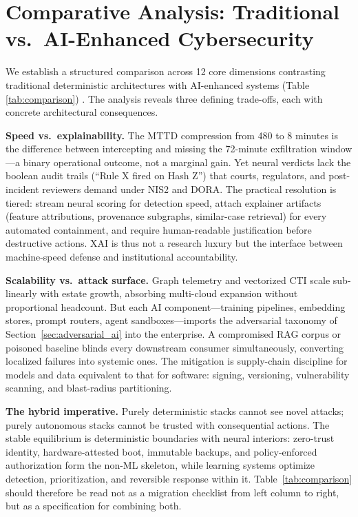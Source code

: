 \documentclass[conference,10pt,twocolumn,a4paper]{IEEEtran}
\begin{document}
\section{Comparative Analysis: Traditional vs.\ AI-Enhanced Cybersecurity}
We establish a structured comparison across 12 core dimensions contrasting traditional deterministic architectures with AI-enhanced systems (Table \ref{tab:comparison}) \cite{nist_csf_ai_2026, enisa_etl_2025, nist_ir_8596_2025}. The analysis reveals three defining trade-offs, each with concrete architectural consequences.

\textbf{Speed vs.\ explainability.} The MTTD compression from 480 to 8 minutes is the difference between intercepting and missing the 72-minute exfiltration window---a binary operational outcome, not a marginal gain. Yet neural verdicts lack the boolean audit trails (``Rule X fired on Hash Z'') that courts, regulators, and post-incident reviewers demand under NIS2 and DORA. The practical resolution is tiered: stream neural scoring for detection speed, attach explainer artifacts (feature attributions, provenance subgraphs, similar-case retrieval) for every automated containment, and require human-readable justification before destructive actions. XAI is thus not a research luxury but the interface between machine-speed defense and institutional accountability.

\textbf{Scalability vs.\ attack surface.} Graph telemetry and vectorized CTI scale sub-linearly with estate growth, absorbing multi-cloud expansion without proportional headcount. But each AI component---training pipelines, embedding stores, prompt routers, agent sandboxes---imports the adversarial taxonomy of Section~\ref{sec:adversarial_ai} into the enterprise. A compromised RAG corpus or poisoned baseline blinds every downstream consumer simultaneously, converting localized failures into systemic ones. The mitigation is supply-chain discipline for models and data equivalent to that for software: signing, versioning, vulnerability scanning, and blast-radius partitioning.

\textbf{The hybrid imperative.} Purely deterministic stacks cannot see novel attacks; purely autonomous stacks cannot be trusted with consequential actions. The stable equilibrium is deterministic boundaries with neural interiors: zero-trust identity, hardware-attested boot, immutable backups, and policy-enforced authorization form the non-ML skeleton, while learning systems optimize detection, prioritization, and reversible response within it. Table~\ref{tab:comparison} should therefore be read not as a migration checklist from left column to right, but as a specification for combining both.
\end{document}
